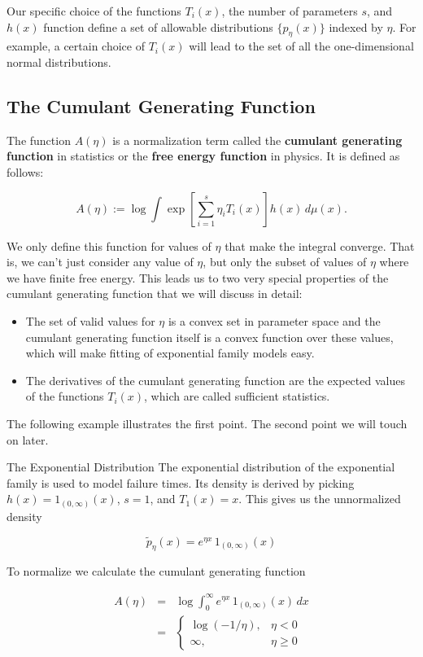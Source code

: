 \documentclass[oneside]{article}
\newenvironment{example}[1][Example]{\begin{trivlist}
\item[\hskip \labelsep {\bfseries #1}]}{\end{trivlist}}
\begin{document}
Our specific choice of the functions $T_i(x)$, the number of parameters $s$, and $h(x)$ function define a set of allowable distributions $\{p_\eta(x)\}$ indexed by $\eta$. For example, a certain choice of $T_i(x)$ will lead to the set of all the one-dimensional normal distributions. 

\subsection{The Cumulant Generating Function}

The function $A(\eta)$ is a normalization term called the \textbf{cumulant generating function} in statistics or the \textbf{free energy function} in physics. It is defined as follows:

\begin{equation}
A(\eta) := \log \int \exp \left[ \sum_{i=1}^s \eta_i T_i(x) \right] h(x)\, d\mu(x).
\end{equation}

We only define this function for values of $\eta$ that make the integral converge. That is, we can't just consider any value of $\eta$, but only the subset of values of $\eta$ where we have finite free energy. This leads us to two very special properties of the cumulant generating function that we will discuss in detail:

\begin{itemize}
\item The set of valid values for $\eta$ is a convex set in parameter space and the cumulant generating function itself is a convex function over these values, which will make fitting of exponential family models easy. 
\item The derivatives of the cumulant generating function are the expected values of the functions $T_i(x)$, which are called sufficient statistics. 
\end{itemize}

The following example illustrates the first point. The second point we will touch on later.

\begin{example}{The Exponential Distribution}
The exponential distribution of the exponential family is used to model failure times. Its density is derived by picking $h(x)=1_{(0,\infty)}(x)$, $s=1$, and $T_1(x) = x$. This gives us the unnormalized density

\begin{equation}
\widetilde{p}_\eta(x) = e^{\eta x}\, 1_{(0,\infty)}(x)
\end{equation}

To normalize we calculate the cumulant generating function

\begin{eqnarray}
A(\eta) &=& \log \int_0^\infty e^{\eta x} \, 1_{(0,\infty)}(x)\, dx\nonumber\\
&=&
\begin{cases}
\log(-1/\eta),& \eta < 0\\
\infty, & \eta \ge 0
\end{cases}
\end{eqnarray}
\end{example}
\end{document}
